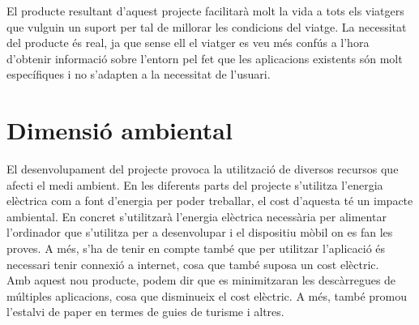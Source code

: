 El producte resultant d'aquest projecte facilitarà molt la vida a tots els viatgers
que vulguin un suport per tal de millorar les condicions del viatge. La necessitat del producte és real, ja que sense ell el viatger es veu més confús a l'hora
d'obtenir informació sobre l'entorn pel fet que les aplicacions existents són
molt específiques i no s'adapten a la necessitat de l'usuari.

\clearpage
\section{Dimensió ambiental}
El desenvolupament del projecte provoca la utilització de diversos recursos
que afecti el medi ambient. En les diferents parts del projecte s'utilitza l'energia elèctrica com a font d'energia per poder treballar, el cost d'aquesta té un
impacte ambiental. En concret s'utilitzarà l'energia elèctrica necessària per alimentar l'ordinador que s'utilitza per a desenvolupar i el dispositiu mòbil on
es fan les proves. A més, s'ha de tenir en compte també que per utilitzar l'aplicació és necessari tenir connexió a internet, cosa que també suposa un cost
elèctric.\\

Amb aquest nou producte, podem dir que es minimitzaran les descàrregues
de múltiples aplicacions, cosa que disminueix el cost elèctric. A més, també
promou l'estalvi de paper en termes de guies de turisme i altres.